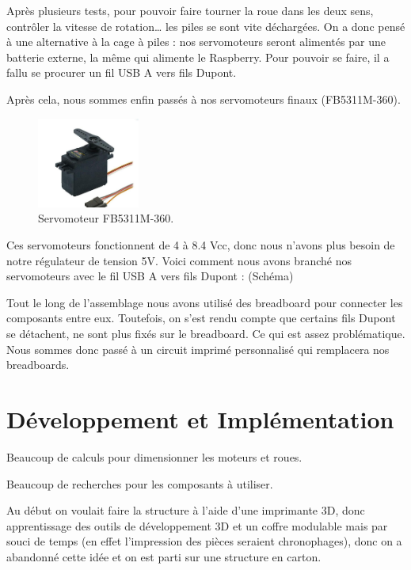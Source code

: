 \documentclass[a4paper,12pt]{report}  %
\begin{document}
Après plusieurs tests, pour pouvoir faire tourner la roue dans les deux sens, contrôler la vitesse de rotation… les piles se sont vite déchargées. On a donc pensé à une alternative à la cage à piles : nos servomoteurs seront alimentés par une batterie externe, la même qui alimente le Raspberry. Pour pouvoir se faire, il a fallu se procurer un fil USB A vers fils Dupont.

Après cela, nous sommes enfin passés à nos servomoteurs finaux (FB5311M-360). \\

\begin{figure}[H]
	\centering
	\includegraphics[width=0.3\textwidth]{./attachments/moteur_servo.jpg}
	\caption{Servomoteur FB5311M-360.}
\end{figure}

Ces servomoteurs fonctionnent de 4 à 8.4 Vcc, donc nous n’avons plus besoin de notre régulateur de tension 5V. Voici comment nous avons branché nos servomoteurs avec le fil USB A vers fils Dupont : 
(Schéma)

Tout le long de l’assemblage nous avons utilisé des breadboard pour connecter les composants entre eux. Toutefois, on s’est rendu compte que certains fils Dupont se détachent, ne sont plus fixés sur le breadboard. Ce qui est assez problématique. 
Nous sommes donc passé à un circuit imprimé personnalisé qui remplacera nos breadboards.


\section{Développement et Implémentation}

Beaucoup de calculs pour dimensionner les moteurs et roues.

Beaucoup de recherches pour les composants à utiliser.

Au début on voulait faire la structure à l'aide d'une imprimante 3D, donc 
apprentissage des outils de développement 3D et un coffre modulable mais 
par souci de temps (en effet l'impression des pièces seraient chronophages), 
donc on a abandonné cette idée et on est parti sur une structure en carton.
\end{document}
